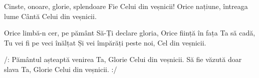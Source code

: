 \beginverse
Cinste, onoare, glorie, splendoare
Fie Celui din veșnicii!
Orice națiune, întreaga lume
Cântă Celui din veșnicii.
\endverse

\beginchorus
Orice limbă-n cer, pe pământ
Să-Ți declare gloria,
Orice ființă în fața Ta să cadă,
Tu vei fi pe veci înălțat
Și vei împărăți peste noi,
Cel din veșnicii.
\endchorus

\beginverse*
/: Pământul așteaptă venirea Ta,
Glorie Celui din veșnicii.
Să fie văzută doar slava Ta,
Glorie Celui din veșnicii. :/
\endverse
\endsong